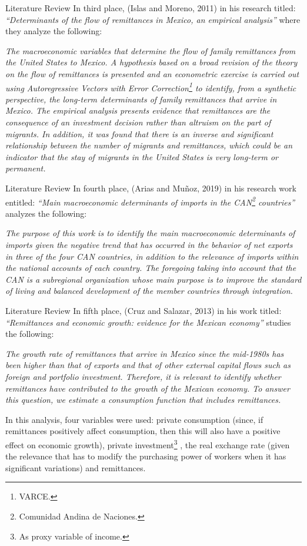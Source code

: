 \begin{frame}{Literature Review}
In third place, (Islas and Moreno, 2011) in his research titled: \textit{“Determinants of the flow of remittances in Mexico, an empirical analysis”} where they analyze the following:\par
\textit{The macroeconomic variables that determine the flow of family remittances from the United States to Mexico. A hypothesis based on a broad revision of the theory on the flow of remittances is presented and an econometric exercise is carried out using Autoregressive Vectors with Error Correction\footnote{VARCE.}  to identify, from a synthetic perspective, the long-term determinants of family remittances that arrive in Mexico. The empirical analysis presents evidence that remittances are the consequence of an investment decision rather than altruism on the part of migrants. In addition, it was found that there is an inverse and significant relationship between the number of migrants and remittances, which could be an indicator that the stay of migrants in the United States is very long-term or permanent.}\par
	\end{frame}
\begin{frame}{Literature Review}
In fourth place, (Arias and Muñoz, 2019) in his research work entitled: \textit{“Main macroeconomic determinants of imports in the CAN\footnote{Comunidad Andina de Naciones.}   countries”} analyzes the following:\par
\textit{The purpose of this work is to identify the main macroeconomic determinants of imports given the negative trend that has occurred in the behavior of net exports in three of the four CAN countries, in addition to the relevance of imports within the national accounts of each country. The foregoing taking into account that the CAN is a subregional organization whose main purpose is to improve the standard of living and balanced development of the member countries through integration.}\par
	\end{frame}
\begin{frame}{Literature Review}
In fifth place, (Cruz and Salazar, 2013) in his work titled: \textit{“Remittances and economic growth: evidence for the Mexican economy”} studies the following:\par
\textit{The growth rate of remittances that arrive in Mexico since the mid-1980s has been higher than that of exports and that of other external capital flows such as foreign and portfolio investment. Therefore, it is relevant to identify whether remittances have contributed to the growth of the Mexican economy. To answer this question, we estimate a consumption function that includes remittances.}\par
In this analysis, four variables were used: private consumption (since, if remittances positively affect consumption, then this will also have a positive effect on economic growth), private investment\footnote{As proxy variable of income.} , the real exchange rate (given the relevance that has to modify the purchasing power of workers when it has significant variations) and remittances. 
\end{frame}